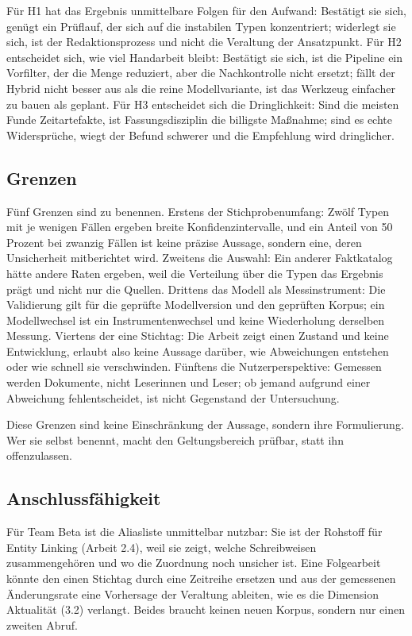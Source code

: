 Für H1 hat das Ergebnis unmittelbare Folgen für den Aufwand: Bestätigt sie sich, genügt ein
Prüflauf, der sich auf die instabilen Typen konzentriert; widerlegt sie sich, ist der
Redaktionsprozess und nicht die Veraltung der Ansatzpunkt. Für H2 entscheidet sich, wie viel
Handarbeit bleibt: Bestätigt sie sich, ist die Pipeline ein Vorfilter, der die Menge
reduziert, aber die Nachkontrolle nicht ersetzt; fällt der Hybrid nicht besser aus als die
reine Modellvariante, ist das Werkzeug einfacher zu bauen als geplant. Für H3 entscheidet
sich die Dringlichkeit: Sind die meisten Funde Zeitartefakte, ist Fassungsdisziplin die
billigste Maßnahme; sind es echte Widersprüche, wiegt der Befund schwerer und die Empfehlung
wird dringlicher.


\subsection{Grenzen}

Fünf Grenzen sind zu benennen. Erstens der Stichprobenumfang: Zwölf Typen mit je wenigen
Fällen ergeben breite Konfidenzintervalle, und ein Anteil von 50 Prozent bei zwanzig Fällen
ist keine präzise Aussage, sondern eine, deren Unsicherheit mitberichtet wird. Zweitens die
Auswahl: Ein anderer Faktkatalog hätte andere Raten ergeben, weil die Verteilung über die
Typen das Ergebnis prägt und nicht nur die Quellen. Drittens das Modell als Messinstrument:
Die Validierung gilt für die geprüfte Modellversion und den geprüften Korpus; ein
Modellwechsel ist ein Instrumentenwechsel und keine Wiederholung derselben Messung. Viertens
der eine Stichtag: Die Arbeit zeigt einen Zustand und keine Entwicklung, erlaubt also keine
Aussage darüber, wie Abweichungen entstehen oder wie schnell sie verschwinden. Fünftens die
Nutzerperspektive: Gemessen werden Dokumente, nicht Leserinnen und Leser; ob jemand aufgrund
einer Abweichung fehlentscheidet, ist nicht Gegenstand der Untersuchung.

Diese Grenzen sind keine Einschränkung der Aussage, sondern ihre Formulierung. Wer sie selbst
benennt, macht den Geltungsbereich prüfbar, statt ihn offenzulassen.

\subsection{Anschlussfähigkeit}

Für Team Beta ist die Aliasliste unmittelbar nutzbar: Sie ist der Rohstoff für Entity Linking
(Arbeit 2.4), weil sie zeigt, welche Schreibweisen zusammengehören und wo die Zuordnung noch
unsicher ist. Eine Folgearbeit könnte den einen Stichtag durch eine Zeitreihe ersetzen und aus
der gemessenen Änderungsrate eine Vorhersage der Veraltung ableiten, wie es die Dimension
Aktualität (3.2) verlangt. Beides braucht keinen neuen Korpus, sondern nur einen zweiten
Abruf.
